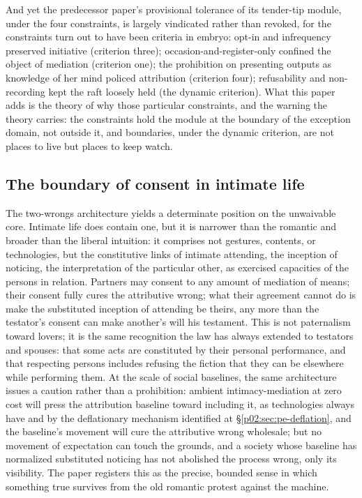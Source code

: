 And yet the predecessor paper's provisional tolerance of its tender-tip module, under the four constraints, is largely vindicated rather than revoked, for the constraints turn out to have been criteria in embryo: opt-in and infrequency preserved initiative (criterion three); occasion-and-register-only confined the object of mediation (criterion one); the prohibition on presenting outputs as knowledge of her mind policed attribution (criterion four); refusability and non-recording kept the raft loosely held (the dynamic criterion). What this paper adds is the theory of why those particular constraints, and the warning the theory carries: the constraints hold the module at the boundary of the exception domain, not outside it, and boundaries, under the dynamic criterion, are not places to live but places to keep watch.

\subsection{The boundary of consent in intimate life}
\label{p02:sec:implications-consent}

The two-wrongs architecture yields a determinate position on the unwaivable core. Intimate life does contain one, but it is narrower than the romantic and broader than the liberal intuition: it comprises not gestures, contents, or technologies, but the constitutive links of intimate attending, the inception of noticing, the interpretation of the particular other, as exercised capacities of the persons in relation. Partners may consent to any amount of mediation of means; their consent fully cures the attributive wrong; what their agreement cannot do is make the substituted inception of attending be theirs, any more than the testator's consent can make another's will his testament. This is not paternalism toward lovers; it is the same recognition the law has always extended to testators and spouses: that some acts are constituted by their personal performance, and that respecting persons includes refusing the fiction that they can be elsewhere while performing them. At the scale of social baselines, the same architecture issues a caution rather than a prohibition: ambient intimacy-mediation at zero cost will press the attribution baseline toward including it, as technologies always have and by the deflationary mechanism identified at \S\ref{p02:sec:pe-deflation}, and the baseline's movement will cure the attributive wrong wholesale; but no movement of expectation can touch the grounds, and a society whose baseline has normalized substituted noticing has not abolished the process wrong, only its visibility. The paper registers this as the precise, bounded sense in which something true survives from the old romantic protest against the machine.

